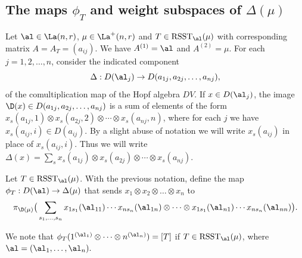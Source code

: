 \subsection{The maps \texorpdfstring{$\phi_T$}{phi\_T} and weight subspaces of \texorpdfstring{$\Delta(\mu)$}{Delta(mu)}}\label{s2.3} Let $\al \in \La(n,r)$, $\mu \in \La^{+}(n,r)$ and $T \in  \mathrm{RSST}_{\al}(\mu)$ with corresponding matrix $A=A_T=(a_{ij})$. We have $A^{(1)}=\al $ and $A^{(2)}=\mu$. For each $j=1,2,\dots,n$, consider the indicated component \begin{equation}\label{D} \Delta: D(\al_j) \to D(a_{1j},a_{2j},\dots,a_{nj}),\end{equation} of the comultiplication map of the Hopf algebra $DV$. If $x \in D(\al_j)$, the image $\D(x) \in D(a_{1j},a_{2j},\dots,a_{nj})$ is a sum of elements of the form $x_s(a_{1j},1) \otimes x_s(a_{2j},2) \otimes \cdots \otimes x_s(a_{nj},n)$, where for each $j$ we have $x_s(a_{ij},i) \in D(a_{ij})$. By a slight abuse of notation we will write $x_s(a_{ij})$ in place of $x_s(a_{ij},i)$. Thus we will write $\Delta(x) = \sum_{s}x_s(a_{1j}) \otimes x_s(a_{2j}) \otimes \cdots \otimes x_s(a_{nj})$.
\begin{defi}\label{def2.4}
	Let $T \in \mathrm{RSST}_{\al}(\mu)$. With the previous notation, define the map $ \phi_{T}:D(\al) \to \Delta(\mu)$ that sends  $x_1 \otimes x_2 \otimes \dots\otimes x_n$ to \[\pi_{\D(\mu)} \big( \sum_{s_1,\dots,s_n}x_{1s_1}(\al_{11}) \cdots x_{ns_n}(\al_{1n}) \otimes  \cdots \otimes x_{1s_1}(\al_{n1})\cdots x_{ns_n}(\al_{nn}) \big). \]
\end{defi}
\begin{rema}\label{remarkphi}
	We note that $\phi_T(1^{(\al_1)} \otimes \cdots \otimes n^{(\al_n)} )=[T]$ if $T \in \mathrm{RSST}_{\al}(\mu)$, where $\al = (\al_1,\dots,\al_n).$
\end{rema}
